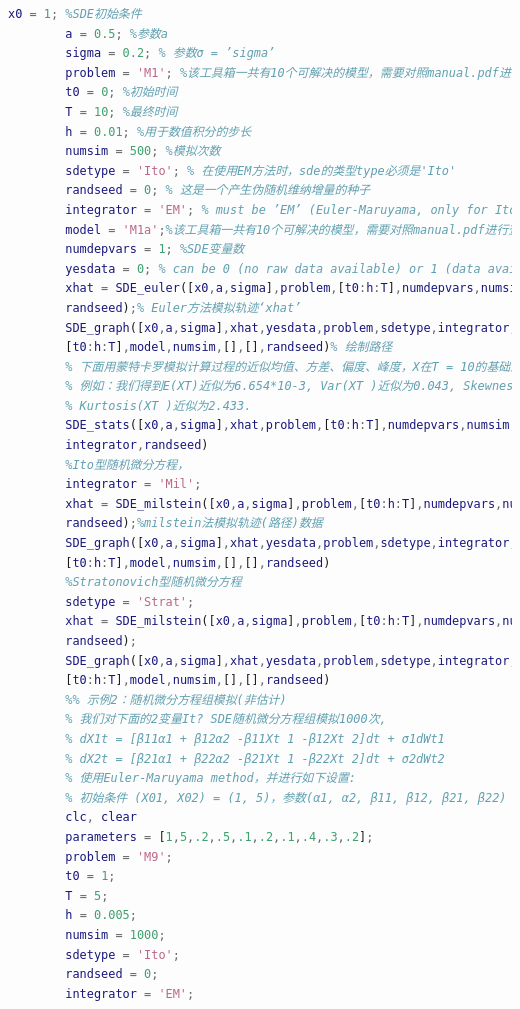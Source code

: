 \begin{lstlisting}[language= Matlab]
        x0 = 1; %SDE初始条件
        a = 0.5; %参数a
        sigma = 0.2; % 参数σ = ’sigma’
        problem = 'M1'; %该工具箱一共有10个可解决的模型，需要对照manual.pdf进行查看
        t0 = 0; %初始时间
        T = 10; %最终时间
        h = 0.01; %用于数值积分的步长
        numsim = 500; %模拟次数
        sdetype = 'Ito'; % 在使用EM方法时，sde的类型type必须是'Ito'
        randseed = 0; % 这是一个产生伪随机维纳增量的种子
        integrator = 'EM'; % must be ’EM’ (Euler-Maruyama, only for Ito SDEs) or ’Mil’
        model = 'M1a';%该工具箱一共有10个可解决的模型，需要对照manual.pdf进行查看
        numdepvars = 1; %SDE变量数
        yesdata = 0; % can be 0 (no raw data available) or 1 (data available)
        xhat = SDE_euler([x0,a,sigma],problem,[t0:h:T],numdepvars,numsim,sdetype,...
        randseed);% Euler方法模拟轨迹‘xhat’
        SDE_graph([x0,a,sigma],xhat,yesdata,problem,sdetype,integrator,numdepvars,...
        [t0:h:T],model,numsim,[],[],randseed)% 绘制路径
        % 下面用蒙特卡罗模拟计算过程的近似均值、方差、偏度、峰度，X在T = 10的基础上的模拟轨迹
        % 例如：我们得到E(XT)近似为6.654*10-3, Var(XT )近似为0.043, Skewness(XT )近似为0 and
        % Kurtosis(XT )近似为2.433.
        SDE_stats([x0,a,sigma],xhat,problem,[t0:h:T],numdepvars,numsim,sdetype,...
        integrator,randseed)
        %Ito型随机微分方程，
        integrator = 'Mil';
        xhat = SDE_milstein([x0,a,sigma],problem,[t0:h:T],numdepvars,numsim,sdetype,...
        randseed);%milstein法模拟轨迹(路径)数据
        SDE_graph([x0,a,sigma],xhat,yesdata,problem,sdetype,integrator,numdepvars,...
        [t0:h:T],model,numsim,[],[],randseed)
        %Stratonovich型随机微分方程
        sdetype = 'Strat';
        xhat = SDE_milstein([x0,a,sigma],problem,[t0:h:T],numdepvars,numsim,sdetype,...
        randseed);
        SDE_graph([x0,a,sigma],xhat,yesdata,problem,sdetype,integrator,numdepvars,...
        [t0:h:T],model,numsim,[],[],randseed)
        %% 示例2：随机微分方程组模拟(非估计)
        % 我们对下面的2变量It? SDE随机微分方程组模拟1000次,
        % dX1t = [β11α1 + β12α2 -β11Xt 1 -β12Xt 2]dt + σ1dWt1
        % dX2t = [β21α1 + β22α2 -β21Xt 1 -β22Xt 2]dt + σ2dWt2
        % 使用Euler-Maruyama method，并进行如下设置:
        % 初始条件 (X01, X02) = (1, 5)，参数(α1, α2, β11, β12, β21, β22) = (.2, .5, .1, .2, .1, .4, .3, .2), [t0, T] = [1, 5], h = 0.005.
        clc, clear
        parameters = [1,5,.2,.5,.1,.2,.1,.4,.3,.2];
        problem = 'M9';
        t0 = 1;
        T = 5;
        h = 0.005;
        numsim = 1000;
        sdetype = 'Ito';
        randseed = 0;
        integrator = 'EM';

\end{lstlisting}
